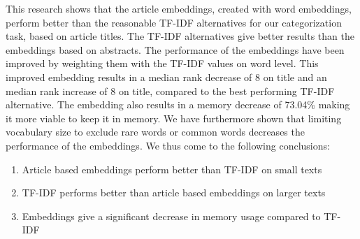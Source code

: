 \documentclass[../../Thesis.tex]{subfiles}
\begin{document}
This research shows that the article embeddings, created with word embeddings, perform better than the reasonable TF-IDF alternatives for our categorization task, based on article titles. The TF-IDF alternatives give better results than the embeddings based on abstracts. The performance of the embeddings have been improved by weighting them with the TF-IDF values on word level. This improved embedding results in a median rank decrease of 8 on title and an median rank increase of 8 on title, compared to the best performing TF-IDF alternative.  The embedding also results in a memory decrease of 73.04\% making it more viable to keep it in memory.
We have furthermore shown that limiting vocabulary size to exclude rare words or common words decreases the performance of the embeddings. We thus come to the following conclusions:
\begin{enumerate}
\item{Article based embeddings perform better than TF-IDF on small texts}
\item{TF-IDF performs better than article based embeddings on larger texts}
\item{Embeddings give a significant decrease in memory usage compared to TF-IDF}
\end{enumerate}
\end{document}
